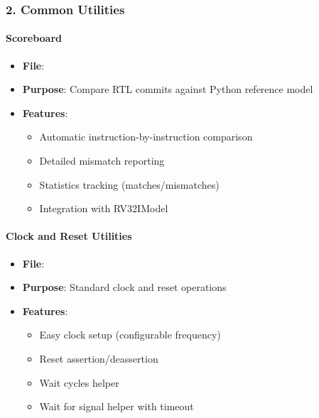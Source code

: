 \subsubsection{2. Common Utilities}\label{cr:app:archive-cocotb-setup-summary:2-common-utilities}

\paragraph{Scoreboard}\label{cr:app:archive-cocotb-setup-summary:scoreboard}

\begin{record}

\begin{itemize}
\tightlist
\item
  \textbf{File}: 
\item
  \textbf{Purpose}: Compare RTL commits against Python reference model
\item
  \textbf{Features}:

  \begin{itemize}
  \tightlist
  \item
    Automatic instruction-by-instruction comparison
  \item
    Detailed mismatch reporting
  \item
    Statistics tracking (matches/\allowbreak{}mismatches)
  \item
    Integration with RV32IModel
  \end{itemize}
\end{itemize}

\end{record}

\paragraph{Clock and Reset Utilities}\label{cr:app:archive-cocotb-setup-summary:clock-and-reset-utilities}

\begin{record}

\begin{itemize}
\tightlist
\item
  \textbf{File}: 
\item
  \textbf{Purpose}: Standard clock and reset operations
\item
  \textbf{Features}:

  \begin{itemize}
  \tightlist
  \item
    Easy clock setup (configurable frequency)
  \item
    Reset assertion/\allowbreak{}deassertion
  \item
    Wait cycles helper
  \item
    Wait for signal helper with timeout
  \end{itemize}
\end{itemize}

\end{record}

